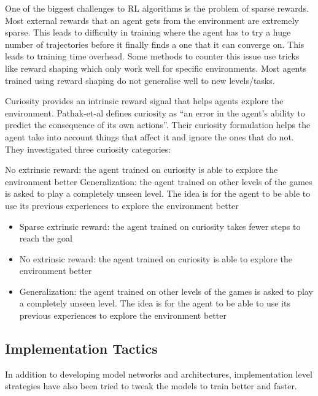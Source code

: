 \documentclass[conference]{IEEEtran}
\begin{document}
One of the biggest challenges to RL algorithms is the problem of sparse rewards. Most external rewards that an agent gets from the environment are extremely sparse. This leads to difficulty in training where the agent has to try a huge number of trajectories before it finally finds a one that it can converge on. This leads to training time overhead. Some methods to counter this issue use tricks like reward shaping which only work well for specific environments. Most agents trained using reward shaping do not generalise well to new levels/tasks. 

Curiosity provides an intrinsic reward signal that helps agents explore the environment. Pathak-et-al \cite{Pathak-et-al} defines curiosity as “an error in the agent’s ability to predict the consequence of its own actions”. Their curiosity formulation helps the agent take into account things that affect it and ignore the ones that do not. They investigated three curiosity categories:

No extrinsic reward: the agent trained on curiosity is able to explore the environment better
Generalization: the agent trained on other levels of the games is asked to play a completely unseen level. The idea is for the agent to be able to use its previous experiences to explore the environment better


\begin{itemize}
\item Sparse extrinsic reward: the agent trained on curiosity takes fewer steps to reach the goal
\item No extrinsic reward: the agent trained on curiosity is able to explore the environment better
\item Generalization: the agent trained on other levels of the games is asked to play a completely unseen level.
The idea is for the agent to be able to use its previous experiences to explore the environment better
\end{itemize}

\subsection{\textbf{Implementation Tactics}}

In addition to developing model networks and architectures, implementation level strategies have also been tried to tweak the models to train better and faster.
\end{document}
